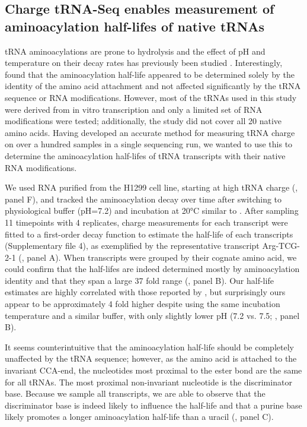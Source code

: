 \documentclass[9pt,lineno]{elife}
\begin{document}
\subsection{Charge tRNA-Seq enables measurement of aminoacylation half-lifes of native tRNAs}
tRNA aminoacylations are prone to hydrolysis and the effect of pH and temperature on their decay rates has previously been studied \citep{Hentzen1972-yd}.
Interestingly, \cite{Peacock2014-wk} found that the aminoacylation half-life appeared to be determined solely by the identity of the amino acid attachment and not affected significantly by the tRNA sequence or RNA modifications.
However, most of the tRNAs used in this study were derived from in vitro transcription and only a limited set of RNA modifications were tested; additionally, the study did not cover all 20 native amino acids.
Having developed an accurate method for measuring tRNA charge on over a hundred samples in a single sequencing run, we wanted to use this to determine the aminoacylation half-lifes of tRNA transcripts with their native RNA modifications.

We used RNA purified from the H1299 cell line, starting at high tRNA charge (, panel F), and tracked the aminoacylation decay over time after switching to physiological buffer (pH=7.2) and incubation at 20°C similar to \cite{Peacock2014-wk}.
After sampling 11 timepoints with 4 replicates, charge measurements for each transcript were fitted to a first-order decay function to estimate the half-life of each transcripts (Supplementary file 4), as exemplified by the representative transcript Arg-TCG-2-1 (, panel A).
When transcripts were grouped by their cognate amino acid, we could confirm that the half-lifes are indeed determined mostly by aminoacylation identity and that they span a large 37 fold range (, panel B).
Our half-life estimates are highly correlated with those reported by \cite{Peacock2014-wk}, but surprisingly ours appear to be approximately 4 fold higher despite using the same incubation temperature and a similar buffer, with only slightly lower pH (7.2 vs. 7.5; , panel B).

It seems counterintuitive that the aminoacylation half-life should be completely unaffected by the tRNA sequence; however, as the amino acid is attached to the invariant CCA-end, the nucleotides most proximal to the ester bond are the same for all tRNAs.
The most proximal non-invariant nucleotide is the discriminator base.
Because we sample all transcripts, we are able to observe that the discriminator base is indeed likely to influence the half-life and that a purine base likely promotes a longer aminoacylation half-life than a uracil (, panel C).
\end{document}
